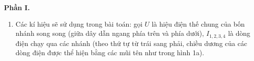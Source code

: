 \begin{loigiai}\[\]
\textbf{Phần I.}
\begin{enumerate}[1)]
    \item Các kí hiệu sẽ sử dụng trong bài toán: gọi $U$ là hiệu điện thế chung của bốn nhánh song song (giữa dây dẫn ngang phía trên và phía dưới), $I_{1,2,3,4}$ là dòng điện chạy qua các nhánh (theo thứ tự từ trái sang phải, chiều dương của các dòng điện được thể hiện bằng các mũi tên như trong hình 1a).
    \begin{center}
        


\begin{tikzpicture}[x=0.75pt,y=0.75pt,yscale=-1,xscale=1]


\end{tikzpicture}
\end{center}
\end{enumerate}
\end{loigiai}
